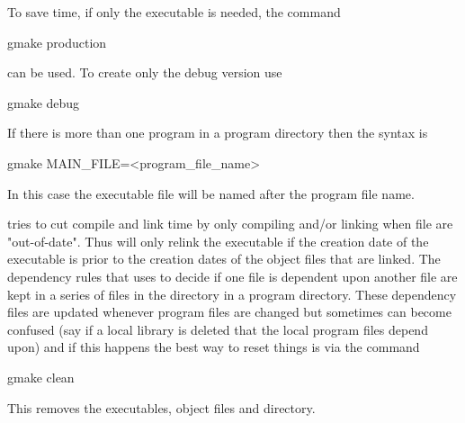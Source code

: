 To save time, if only the  executable is needed, the command
\begin{example}
  gmake production
\end{example}
can be used. To create only the debug version use
\begin{example}
  gmake debug
\end{example}
If there is more than one program in a program directory then the
 syntax is
\begin{example}
  gmake MAIN_FILE=<program_file_name>
\end{example}
In this case the executable file will be named after the program file
name.

 tries to cut compile and link time by only compiling and/or
linking when file are "out-of-date". Thus  will only relink
the executable if the creation date of the executable is prior to the
creation dates of the object files that are linked. The dependency
rules that  uses to decide if one file is dependent upon
another file are kept in a series of files in the 
directory in a program directory. These dependency files are updated
whenever program files are changed but sometimes  can become
confused (say if a local library is deleted that the local program
files depend upon) and if this happens the best way to reset things is
via the command
\begin{example}
  gmake clean
\end{example}
This removes the executables, object files and  directory.

